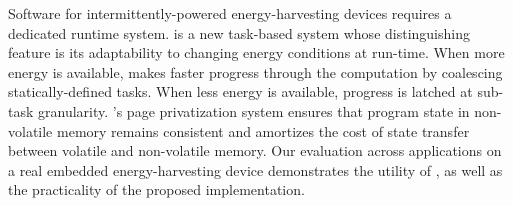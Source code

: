 Software for intermittently-powered energy-harvesting devices requires a dedicated runtime system. \sys is a new task-based system whose distinguishing feature is its adaptability to changing energy conditions at run-time. When more energy is available, \sys makes faster progress through the computation by coalescing statically-defined tasks. When less energy is available, progress is latched at sub-task granularity. \sys's page privatization system ensures that program state in non-volatile memory remains consistent and amortizes the cost of state transfer between volatile and non-volatile memory. Our evaluation across applications on a real embedded energy-harvesting device demonstrates the utility of \sys, as well as the practicality of the proposed implementation.
